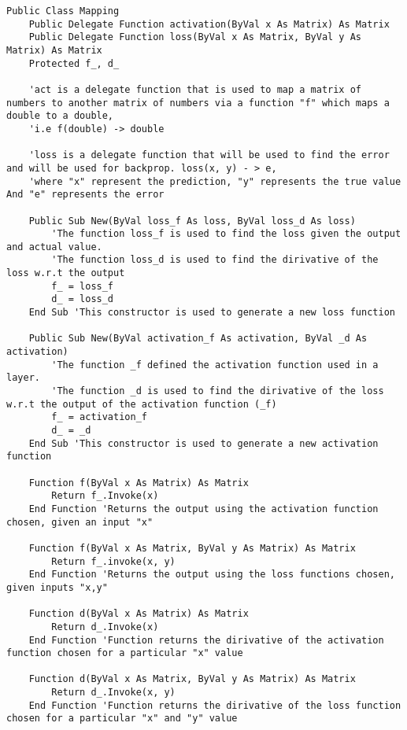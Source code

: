 \begin{verbatim}
Public Class Mapping
    Public Delegate Function activation(ByVal x As Matrix) As Matrix
    Public Delegate Function loss(ByVal x As Matrix, ByVal y As Matrix) As Matrix
    Protected f_, d_

    'act is a delegate function that is used to map a matrix of numbers to another matrix of numbers via a function "f" which maps a double to a double, 
    'i.e f(double) -> double

    'loss is a delegate function that will be used to find the error and will be used for backprop. loss(x, y) - > e, 
    'where "x" represent the prediction, "y" represents the true value And "e" represents the error 

    Public Sub New(ByVal loss_f As loss, ByVal loss_d As loss)
        'The function loss_f is used to find the loss given the output and actual value.
        'The function loss_d is used to find the dirivative of the loss w.r.t the output
        f_ = loss_f
        d_ = loss_d
    End Sub 'This constructor is used to generate a new loss function

    Public Sub New(ByVal activation_f As activation, ByVal _d As activation)
        'The function _f defined the activation function used in a layer.
        'The function _d is used to find the dirivative of the loss w.r.t the output of the activation function (_f)
        f_ = activation_f
        d_ = _d
    End Sub 'This constructor is used to generate a new activation function

    Function f(ByVal x As Matrix) As Matrix
        Return f_.Invoke(x)
    End Function 'Returns the output using the activation function chosen, given an input "x"

    Function f(ByVal x As Matrix, ByVal y As Matrix) As Matrix
        Return f_.invoke(x, y)
    End Function 'Returns the output using the loss functions chosen, given inputs "x,y"

    Function d(ByVal x As Matrix) As Matrix
        Return d_.Invoke(x)
    End Function 'Function returns the dirivative of the activation function chosen for a particular "x" value

    Function d(ByVal x As Matrix, ByVal y As Matrix) As Matrix
        Return d_.Invoke(x, y)
    End Function 'Function returns the dirivative of the loss function chosen for a particular "x" and "y" value



\end{verbatim}
